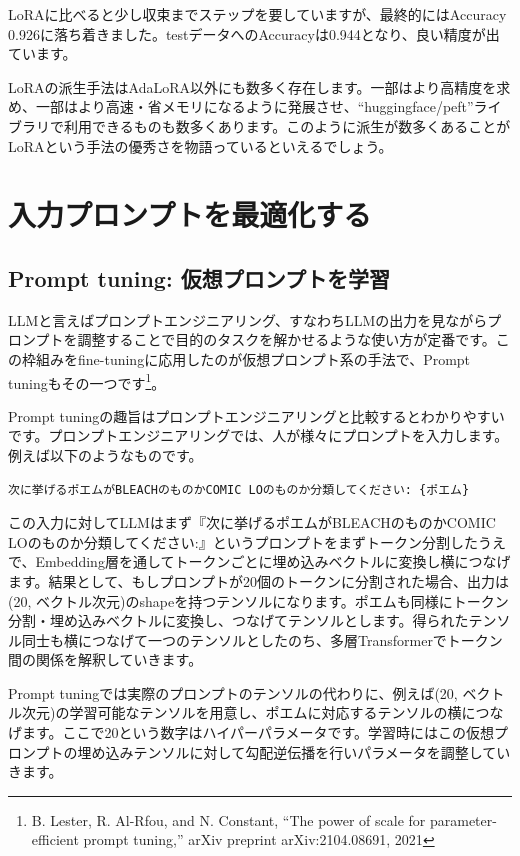 \documentclass[a5paper,twoside,dvipdfmx]{jsarticle}
\begin{document}
LoRAに比べると少し収束までステップを要していますが、最終的にはAccuracy 0.926に落ち着きました。testデータへのAccuracyは0.944となり、良い精度が出ています。

LoRAの派生手法はAdaLoRA以外にも数多く存在します。一部はより高精度を求め、一部はより高速・省メモリになるように発展させ、``huggingface/peft''ライブラリで利用できるものも数多くあります。このように派生が数多くあることがLoRAという手法の優秀さを物語っているといえるでしょう。

\newpage

\section{入力プロンプトを最適化する}

\subsection{Prompt tuning: 仮想プロンプトを学習}

LLMと言えばプロンプトエンジニアリング、すなわちLLMの出力を見ながらプロンプトを調整することで目的のタスクを解かせるような使い方が定番です。この枠組みをfine-tuningに応用したのが仮想プロンプト系の手法で、\textsf{Prompt tuning}もその一つです\footnote{B. Lester, R. Al-Rfou, and N. Constant, “The power of scale for parameter-efficient prompt tuning,” arXiv preprint arXiv:2104.08691, 2021}。

Prompt tuningの趣旨はプロンプトエンジニアリングと比較するとわかりやすいです。プロンプトエンジニアリングでは、人が様々にプロンプトを入力します。例えば以下のようなものです。

\begin{lstlisting}
次に挙げるポエムがBLEACHのものかCOMIC LOのものか分類してください: {ポエム}
\end{lstlisting}

この入力に対してLLMはまず『次に挙げるポエムがBLEACHのものかCOMIC LOのものか分類してください:』というプロンプトをまずトークン分割したうえで、Embedding層を通してトークンごとに埋め込みベクトルに変換し横につなげます。結果として、もしプロンプトが20個のトークンに分割された場合、出力は(20, ベクトル次元)のshapeを持つテンソルになります。ポエムも同様にトークン分割・埋め込みベクトルに変換し、つなげてテンソルとします。得られたテンソル同士も横につなげて一つのテンソルとしたのち、多層Transformerでトークン間の関係を解釈していきます。

Prompt tuningでは実際のプロンプトのテンソルの代わりに、例えば(20, ベクトル次元)の学習可能なテンソルを用意し、ポエムに対応するテンソルの横につなげます。ここで20という数字はハイパーパラメータです。学習時にはこの仮想プロンプトの埋め込みテンソルに対して勾配逆伝播を行いパラメータを調整していきます。%
\end{document}

